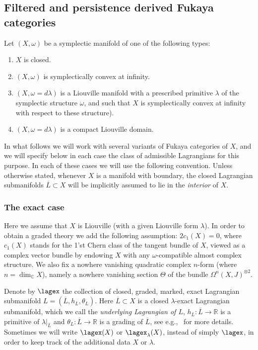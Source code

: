 
\subsection{Filtered and persistence derived Fukaya categories}
\label{s:pdfuk} Let $(X, \omega)$ be a symplectic manifold of one of
the following types:
\begin{enumerate}
\item $X$ is closed.
\item $(X, \omega)$ is symplectically convex at infinity.
\item $(X, \omega = d \lambda)$ is a Liouville manifold with a
  prescribed primitive $\lambda$ of the symplectic structure $\omega$,
  and such that $X$ is symplectically convex at infinity with respect
  to these structure).
\item $(X, \omega = d \lambda)$ is a compact Liouville domain.
\end{enumerate}

In what follows we will work with several variants of Fukaya
categories of $X$, and we will specify below in each case the class of
admissible Lagrangians for this purpose. In each of these cases we
will use the following convention. Unless otherwise stated, whenever
$X$ is a manifold with boundary, the closed Lagrangian submanifolds
$\overline{L} \subset X$ will be implicitly assumed to lie in the {\em
  interior} of $X$.

\subsubsection{The exact case} \label{sb:fuk-ex} Here we assume that
$X$ is Liouville (with a given Liouville form $\lambda$). In order to
obtain a graded theory we add the following assumption: $2c_1(X)=0$,
where $c_1(X)$ stands for the 1'st Chern class of the tangent bundle
of $X$, viewed as a complex vector bundle by endowing $X$ with any
$\omega$-compatible almost complex structure.  We also fix a nowhere
vanishing quadratic complex $n$-form (where
$n = \dim_{\mathbb{C}} X$), namely a nowhere vanishing section
$\Theta$ of the bundle $\Omega^n(X, J)^{\otimes 2}$.

Denote by $\lagex$ the collection of closed, graded, marked, exact
Lagrangian submanifold $L = (\overline{L}, h_L, \theta_L)$. Here
$\overline{L} \subset X$ is a closed $\lambda$-exact Lagrangian
submanifold, which we call the {\em underlying Lagrangian of $L$},
$h_L: \overline{L} \longrightarrow \mathbb{R}$ is a primitive of
$\lambda|_{\overline{L}}$ and
$\theta_L: \overline{L} \longrightarrow \mathbb{R}$ is a grading of
$\overline{L}$, see
e.g.\cite{Se:graded},~\cite[Section~3.2.2.2]{BCZ:tpc} for more
details. Sometimes we will write $\lagex(X)$ or $\lagex_{\lambda}(X)$,
instead of simply $\lagex$, in order to keep track of the additional
data $X$ or $\lambda$.

